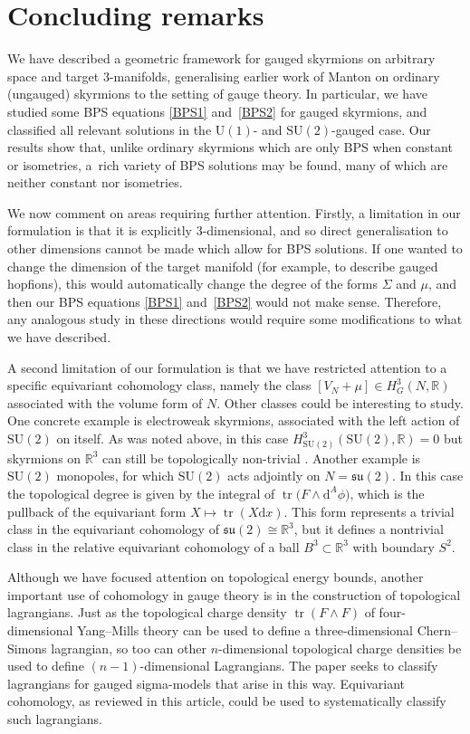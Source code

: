 \documentclass[10pt,a4paper]{amsart}
\newcommand{\su}{{\mathfrak{su}}}
\newcommand{\SU}{{\mathrm{SU}}}
\newcommand{\U}{{\mathrm{U}}}
\newcommand{\R}{{\mathbb{R}}}
\newcommand{\1}{{\mathbb{1}}}
\def \d{\mathrm{d}}
\newcommand{\tr}{{\operatorname{tr}}}
\numberwithin{equation}{section}
\begin{document}
\section{Concluding remarks}
We have described a geometric framework for gauged skyrmions on arbitrary space and target $3$-manifolds, generalising earlier work of Manton \cite{Manton1987geometry} on ordinary (ungauged) skyrmions to the setting of gauge theory. In particular, we have studied some BPS equations \eqref{BPS1} and~\eqref{BPS2} for gauged skyrmions, and classified all relevant solutions in the $\U(1)$- and $\SU(2)$-gauged case. Our results show that, unlike ordinary skyrmions which are only BPS when constant or isometries, a~rich variety of BPS solutions may be found, many of which are neither constant nor isometries.

We now comment on areas requiring further attention. Firstly, a limitation in our formulation is that it is explicitly $3$-dimensional, and so direct generalisation to other dimensions cannot be made which allow for BPS solutions. If one wanted to change the dimension of the target manifold (for example, to describe gauged hopfions), this would automatically change the degree of the forms $\Sigma$ and $\mu$, and then our BPS equations \eqref{BPS1} and~\eqref{BPS2} would not make sense. Therefore, any analogous study in these directions would require some modifications to what we have described.

A second limitation of our formulation is that we have restricted attention to a specific equivariant cohomology class, namely the class $[V_N+\mu]\in H^3_G(N,\R)$ associated with the volume form of $N$. Other classes could be interesting to study. One concrete example is electroweak skyrmions, associated with the left action of $\SU(2)$ on itself. As was noted above, in this case $H^3_{\SU(2)}(\SU(2),\R)=0$ but skyrmions on $\R^3$ can still be topologically non-trivial \cite{criadoKhozeSpannowsky2021emergence,dHokerFarhi1984decoupling}. Another example is $\SU(2)$ monopoles, for which $\SU(2)$ acts adjointly on $N=\su(2)$. In this case the topological degree is given by the integral of $\tr\big(F\wedge \d^A\phi\big)$, which is the pullback of the equivariant form $X\mapsto \tr(X\d x)$. This form represents a trivial class in the equivariant cohomology of $\su(2)\cong\R^3$, but it defines a nontrivial class in the relative equivariant cohomology of a ball $B^3\subset\R^3$ with boundary $S^2$.

Although we have focused attention on topological energy bounds, another important use of cohomology in gauge theory is in the construction of topological lagrangians. Just as the topological charge density $\tr(F\wedge F)$ of four-dimensional Yang--Mills theory can be used to define a three-dimensional Chern--Simons lagrangian, so too can other $n$-dimensional topological charge densities be used to define $(n-1)$-dimensional Lagrangians. The paper \cite{tchrakian2022SkyChernSimons} seeks to classify lagrangians for gauged sigma-models that arise in this way. Equivariant cohomology, as reviewed in this article, could be used to systematically classify such lagrangians.
\end{document}

